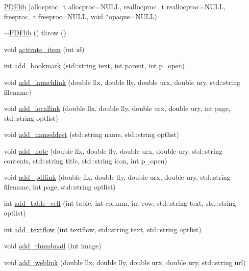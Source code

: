 \begin{DoxyCompactItemize}
\item 
\hyperlink{classPDFlib_a63a60e9b1c4c18e6db742f85011510f3}{P\+D\+Flib} (allocproc\+\_\+t allocproc=N\+U\+L\+L, reallocproc\+\_\+t reallocproc=N\+U\+L\+L, freeproc\+\_\+t freeproc=N\+U\+L\+L, void $\ast$opaque=N\+U\+L\+L)
\item 
\hyperlink{classPDFlib_aac6122db0d8f9eaaf26862f88d2f33ef}{$\sim$\+P\+D\+Flib} ()  throw ()
\item 
void \hyperlink{classPDFlib_a83cf7a11d217af0e33e6dca6267965c4}{activate\+\_\+item} (int id)
\item 
int \hyperlink{classPDFlib_afbf7e219b67e0099610963c1ca9b6dca}{add\+\_\+bookmark} (std\+::string text, int parent, int p\+\_\+open)
\item 
void \hyperlink{classPDFlib_a32faa0f4597b6dceacd54a4a5497823d}{add\+\_\+launchlink} (double llx, double lly, double urx, double ury, std\+::string filename)
\item 
void \hyperlink{classPDFlib_a2d47dcbd27a69e9c1c02ca608f927ab7}{add\+\_\+locallink} (double llx, double lly, double urx, double ury, int page, std\+::string optlist)
\item 
void \hyperlink{classPDFlib_a16845662dabe0494d69b016846f2adcc}{add\+\_\+nameddest} (std\+::string name, std\+::string optlist)
\item 
void \hyperlink{classPDFlib_ab054c136755f297058ac9812adefafec}{add\+\_\+note} (double llx, double lly, double urx, double ury, std\+::string contents, std\+::string title, std\+::string icon, int p\+\_\+open)
\item 
void \hyperlink{classPDFlib_acc2002bc0e060620bfe97eae7dcc9371}{add\+\_\+pdflink} (double llx, double lly, double urx, double ury, std\+::string filename, int page, std\+::string optlist)
\item 
int \hyperlink{classPDFlib_a153ce04a9c160a24d13763f8ba6578fa}{add\+\_\+table\+\_\+cell} (int table, int column, int row, std\+::string text, std\+::string optlist)
\item 
int \hyperlink{classPDFlib_a44f52fd96b6152a2b4ae4f71cebcf36b}{add\+\_\+textflow} (int textflow, std\+::string text, std\+::string optlist)
\item 
void \hyperlink{classPDFlib_a7561fadef64e392f98d047d5b6e79946}{add\+\_\+thumbnail} (int image)
\item 
void \hyperlink{classPDFlib_afdba46325698218399dda4b415204edd}{add\+\_\+weblink} (double llx, double lly, double urx, double ury, std\+::string url)

\end{DoxyCompactItemize}
